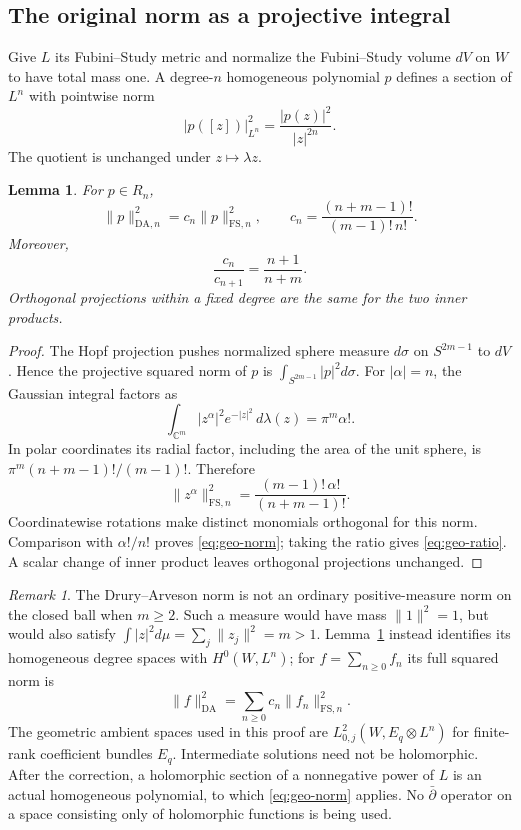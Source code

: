 \documentclass[11pt,reqno]{amsart}
\numberwithin{equation}{section}
\newtheorem{lemma}[theorem]{Lemma}
\theoremstyle{definition}
\theoremstyle{remark}
\newtheorem{remark}[theorem]{Remark}
\newcommand{\C}{\mathbb C}
\newcommand{\FS}{\mathrm{FS}}
\newcommand{\DA}{\mathrm{DA}}
\begin{document}
\subsection{The original norm as a projective integral}
Give $L$ its Fubini--Study metric and normalize the Fubini--Study volume
$dV$ on $W$ to have total mass one.  A degree-$n$ homogeneous polynomial
$p$ defines a section of $L^n$ with pointwise norm
\[
 |p([z])|_{L^n}^2=\frac{|p(z)|^2}{|z|^{2n}}.
\]
The quotient is unchanged under $z\mapsto\lambda z$.

\begin{lemma}\label{geo:norm}
For $p\in R_n$,
\begin{equation}\label{eq:geo-norm}
 \|p\|_{\DA,n}^2=c_n\|p\|_{\FS,n}^2,
 \qquad
 c_n=\frac{(n+m-1)!}{(m-1)!\,n!}.
\end{equation}
Moreover,
\begin{equation}\label{eq:geo-ratio}
 \frac{c_n}{c_{n+1}}=\frac{n+1}{n+m}.
\end{equation}
Orthogonal projections within a fixed degree are the same for the two
inner products.
\end{lemma}
\begin{proof}
The Hopf projection pushes normalized sphere measure $d\sigma$ on
$S^{2m-1}$ to $dV$.  Hence the projective squared norm of $p$ is
$\int_{S^{2m-1}}|p|^2d\sigma$.  For $|\alpha|=n$, the Gaussian
integral factors as
\[
 \int_{\C^m}|z^\alpha|^2e^{-|z|^2}\,d\lambda(z)=\pi^m\alpha!.
\]
In polar coordinates its radial factor, including the area of the unit
sphere, is $\pi^m(n+m-1)!/(m-1)!$.  Therefore
\[
 \|z^\alpha\|_{\FS,n}^2
 =\frac{(m-1)!\,\alpha!}{(n+m-1)!}.
\]
Coordinatewise rotations make distinct monomials orthogonal for this
norm.  Comparison with $\alpha!/n!$ proves
\eqref{eq:geo-norm}; taking the ratio gives
\eqref{eq:geo-ratio}.  A scalar change of inner product leaves
orthogonal projections unchanged.
\end{proof}

\begin{remark}\label{geo:dbar-space}
The Drury--Arveson norm is not an ordinary positive-measure norm on the
closed ball when $m\ge2$.  Such a measure would have mass
$\|1\|^2=1$, but would also satisfy
$\int|z|^2d\mu=\sum_j\|z_j\|^2=m>1$.
Lemma~\ref{geo:norm} instead identifies its homogeneous degree spaces
with $H^0(W,L^n)$; for $f=\sum_{n\geq0}f_n$ its full squared norm is
\[
 \|f\|_{\DA}^2=\sum_{n\geq0}c_n\|f_n\|_{\FS,n}^2.
\]
The geometric ambient spaces used in this proof are
$L^2_{0,j}(W,E_q\otimes L^n)$ for finite-rank coefficient bundles
$E_q$.  Intermediate solutions need not be holomorphic.  After the
correction, a holomorphic section of a nonnegative power of $L$ is an
actual homogeneous polynomial, to which \eqref{eq:geo-norm} applies.
No $\bar\partial$ operator on a space consisting only of holomorphic
functions is being used.
\end{remark}
\end{document}
